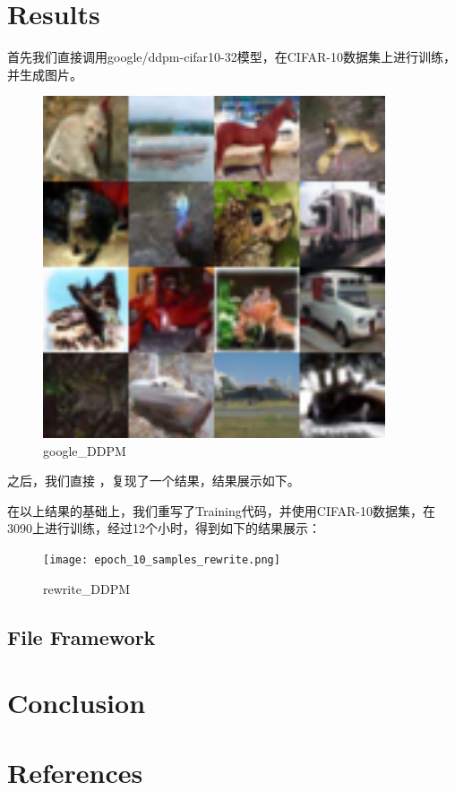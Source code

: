 \documentclass{ctexart}
\begin{document}
\section{Results}
\noindent
首先我们直接调用google/ddpm-cifar10-32模型，在CIFAR-10数据集上进行训练，并生成图片。
\begin{figure}[htb]
    \centering
    \includegraphics[width=0.9\textwidth]{ddpm_cifar10_grid1.png}
    \caption{google_DDPM}
    \label{fig:cifar10_grid}
\end{figure}

\noindent
之后，我们直接  ，复现了一个结果，结果展示如下。

\noindent
在以上结果的基础上，我们重写了Training代码，并使用CIFAR-10数据集，在3090上进行训练，经过12个小时，得到如下的结果展示：
\begin{figure}[htb]
    \centering
    \texttt{[image: epoch\_10\_samples\_rewrite.png]}
    \caption{rewrite_DDPM}
    \label{fig:cifar10_grid}
\end{figure}

\noindent


\subsection{File Framework}


\section{Conclusion}


\section{References}

    
\end{document}
